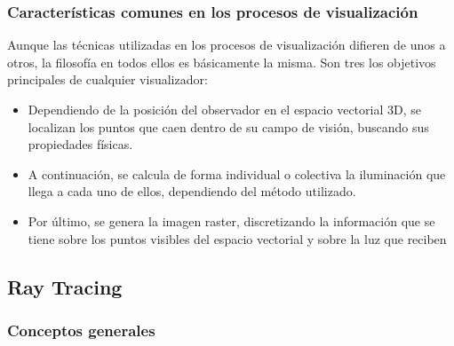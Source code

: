 \subsubsection{Características comunes en los procesos de visualización}
Aunque las técnicas utilizadas en los procesos de visualización difieren de unos a otros, la filosofía en todos ellos es básicamente la misma. Son tres los objetivos principales de cualquier visualizador: 

\begin{itemize}
    \item Dependiendo de la posición del observador en el espacio vectorial 3D, se localizan los puntos que caen dentro de su campo de visión, buscando sus propiedades físicas.
    \item A continuación, se calcula de forma individual o colectiva la iluminación que llega a cada uno de ellos, dependiendo del método utilizado.
    \item Por último, se genera la imagen raster, discretizando la información que se tiene sobre los puntos visibles del espacio vectorial y sobre la luz que reciben

\end{itemize}



\subsection{Ray Tracing}

\subsubsection{Conceptos generales}
\label{section:ray-concept}

